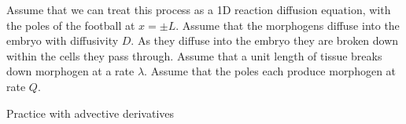 \documentclass[addpoints, 11pt]{exam}
\begin{document}
\begin{questions}
Assume that we can treat this process as a 1D reaction diffusion equation, with the poles of the football at $x=\pm L$. Assume that the morphogens diffuse into the embryo with diffusivity $D$. As they diffuse into the embryo they are broken down within the cells they pass through. Assume that a unit length of tissue breaks down morphogen at a rate $\lambda$. Assume that the poles each produce morphogen at rate $Q$.
\question Practice with advective derivatives
\begin{parts}

\end{parts}
\end{questions}
\end{document}
